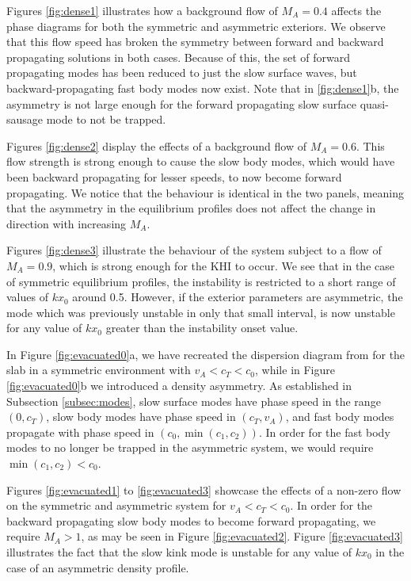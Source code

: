 \documentclass[12pt]{ociamthesis}
\begin{document}
Figures \ref{fig:dense1} illustrates how a background flow of $M_A = 0.4$ affects the phase diagrams for both the symmetric and asymmetric exteriors.
We observe that this flow speed has broken the symmetry between forward and backward propagating solutions in both cases.
Because of this, the set of forward propagating modes has been reduced to just the slow surface waves, but backward-propagating fast body modes now exist.
Note that in \ref{fig:dense1}b, the asymmetry is not large enough for the forward propagating slow surface quasi-sausage mode to not be trapped.

Figures \ref{fig:dense2} display the effects of a background flow of $M_A = 0.6$.
This flow strength is strong enough to cause the slow body modes, which would have been backward propagating for lesser speeds, to now become forward propagating.
We notice that the behaviour is identical in the two panels, meaning that the asymmetry in the equilibrium profiles does not affect the change in direction with increasing $M_A$.

Figures \ref{fig:dense3} illustrate the behaviour of the system subject to a flow of $M_A = 0.9$, which is strong enough for the KHI to occur.
We see that in the case of symmetric equilibrium profiles, the instability is restricted to a short range of values of $k x_0$ around 0.5.
However, if the exterior parameters are asymmetric, the mode which was previously unstable in only that small interval, is now unstable for any value of $k x_0$ greater than the instability onset value.

In Figure \ref{fig:evacuated0}a, we have recreated the dispersion diagram from \cite{Roberts1981b} for the slab in a symmetric environment with $v_A < c_T < c_0$, while in Figure \ref{fig:evacuated0}b we introduced a density asymmetry.
As established in Subsection \ref{subsec:modes}, slow surface modes have phase speed in the range $(0, c_T)$, slow body modes have phase speed in $(c_T, v_A)$, and fast body modes propagate with phase speed in $(c_0, \min(c_1, c_2))$.
In order for the fast body modes to no longer be trapped in the asymmetric system, we would require $\min(c_1, c_2) < c_0$.

Figures \ref{fig:evacuated1} to \ref{fig:evacuated3} showcase the effects of a non-zero flow on the symmetric and asymmetric system for $v_A < c_T < c_0$.
In order for the backward propagating slow body modes to become forward propagating, we require $M_A > 1$, as may be seen in Figure \ref{fig:evacuated2}.
Figure \ref{fig:evacuated3} illustrates the fact that the slow kink mode is unstable for any value of $k x_0$ in the case of an asymmetric density profile.
\end{document}
